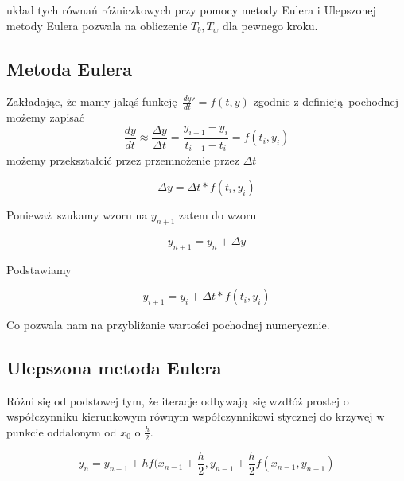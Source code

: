 \documentclass[varwidth,12pt,a4paper]{article}
\begin{document}
układ tych równań różniczkowych przy pomocy metody Eulera i Ulepszonej metody Eulera pozwala na obliczenie $T_b, T_w$ dla pewnego kroku.



\subsection{Metoda Eulera}

Zakładając, że mamy jakąś funkcję $\frac{dy}{dt}' = f(t,y)$
zgodnie z definicją pochodnej możemy zapisać
\begin{equation}
   \frac{dy}{dt} \approx \frac{\Delta y}{\Delta t} = \frac{y_{i+1} - y_i}{t_{i+1} - t_i} = f(t_i, y_i)
\end{equation}
możemy przekształcić przez przemnożenie przez $\Delta t$

\begin{equation}
    \Delta y = \Delta t * f(t_i, y_i)
\end{equation}

Ponieważ szukamy wzoru na $y_{n+1}$ zatem do wzoru

\begin{equation}
    y_{n+1} = y_n + \Delta y
\end{equation}

Podstawiamy

\begin{equation}
    y_{i+1} = y_i + \Delta t * f(t_i, y_i)
\end{equation}

Co pozwala nam na przybliżanie wartości pochodnej numerycznie.



\subsection{Ulepszona metoda Eulera}

Różni się od podstowej tym, że iteracje odbywają się wzdłóż prostej o współczynniku
kierunkowym równym współczynnikowi stycznej do krzywej w punkcie oddalonym od 
$x_0$ o $\frac{h}{2}$.

\begin{equation}
    y_n = y_{n-1} + hf(x_{n-1} + \frac{h}{2}, y_{n-1} + \frac{h}{2} f(x_{n-1}, y_{n-1})
\end{equation}


\end{document}
